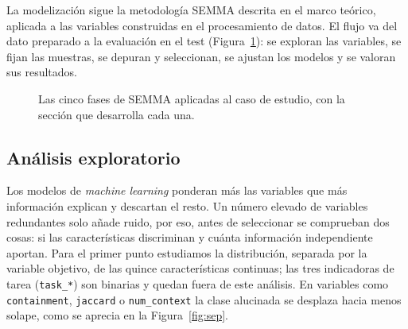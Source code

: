\documentclass[12pt,a4paper]{report}
\theoremstyle{definition}
\newcommand{\tc}[1]{\texttt{#1}}
\begin{document}
La modelización sigue la metodología SEMMA descrita en el marco teórico, aplicada a las variables
construidas en el procesamiento de datos. El flujo va del dato preparado a la evaluación en el test
(Figura~\ref{fig:pipeline}): se exploran las variables, se fijan las muestras, se depuran y
seleccionan, se ajustan los modelos y se valoran sus resultados.

\begin{figure}[H]
\centering
{}
\caption{Las cinco fases de SEMMA aplicadas al caso de estudio, con la sección que desarrolla cada una.}
\label{fig:pipeline}
\end{figure}

\subsection{Análisis exploratorio}
\label{sec:corr}

Los modelos de \emph{machine learning} ponderan más las variables que más información explican y descartan el resto. Un número elevado de variables redundantes solo añade ruido, por eso, antes de seleccionar se comprueban dos cosas: si las características discriminan y cuánta
información independiente aportan.
Para el primer punto estudiamos la distribución, separada por la variable objetivo, de las quince
características continuas; las tres indicadoras de tarea (\tc{task\_*}) son binarias y quedan fuera de
este análisis. En variables como \tc{containment}, \tc{jaccard} o \tc{num\_context} la clase alucinada
se desplaza hacia menos solape, como se aprecia en la Figura~\ref{fig:sep}.
\end{document}
